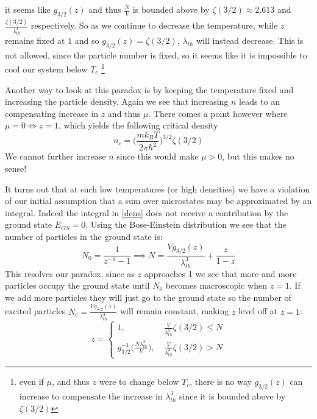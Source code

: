 \documentclass[a4paper,11pt,oneside]{book}
\begin{document}
it seems like $g_{3/2}(z)$ and thus $\frac{N}{V}$ is bounded above by $\zeta(3/2)\approx 2.613$ and $\frac{\zeta(3/2)}{\lambda_{th}^3}$ respectively. So as we continue to decrease the temperature, while $z$ remains fixed at $1$ and so $g_{3/2}(z)=\zeta(3/2)$, $\lambda_{th}$ will instead decrease. This is not allowed, since the particle number is fixed, so it seems like it is impossible to cool our system below $T_c$ \footnote{even if $\mu$, and thus $z$ were to change below $T_c$, there is no way $g_{3/2}(z)$ can increase to compensate the increase in $\lambda_{th}^3$ since it is bounded above by $\zeta(3/2)$}  

Another way to look at this paradox is by keeping the temperature fixed and increasing the particle density. Again we see that increasing $n$ leads to an compensating increase in $z$ and thus $\mu$. There comes a point however where $\mu=0 \iff z=1$, which yields the following critical density
\begin{equation}
    n_c = \bigg(\frac{mk_BT}{2\pi \hbar^2}\bigg)^{3/2} \zeta(3/2)
\end{equation}
We cannot further increase $n$ since this would make $\mu>0$, but this makes no sense!

It turns out that at such low temperatures (or high densities) we have a violation of our initial assumption that a sum over microstates may be approximated by an integral. Indeed the integral in \eqref{dens} does not receive a contribution by the ground state $E_{GS}=0$. Using the Bose-Einstein distribution we see that the number of particles in the ground state is:
\begin{equation}
    N_0 = \frac{1}{z^{-1}-1} \implies \boxed{N = \frac{Vg_{3/2}(z)}{\lambda_{th}^3} + \frac{z}{1-z}}
\end{equation}
This resolves our paradox, since as $z$ approaches 1 we see that more and more particles occupy the ground state until $N_0$ becomes macroscopic when $z=1$. If we add more particles they will just go to the ground state so the number of excited particles $N_e=\frac{Vg_{3/2}(z)}{\lambda_{th}^3}$ will remain constant, making $z$ level off at $z=1$:
\begin{equation}
    z = \begin{cases}
     1, \ &\frac{V}{\lambda_{th}^3}\zeta(3/2)\leq N\\
     g_{3/2}^{-1}\big(\frac{N\lambda_{th}^3}{V}\big), \ &\frac{V}{\lambda_{th}^3}\zeta(3/2)> N
    \end{cases}
\end{equation}
\end{document}
